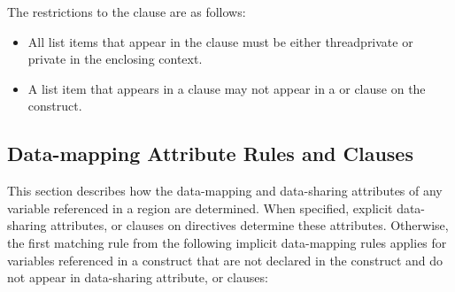 \restrictions
The restrictions to the  clause are as follows:

\begin{itemize}
\item All list items that appear in the  clause must be either threadprivate
or private in the enclosing context.

\item A list item that appears in a  clause may not appear in a  or
 clause on the  construct.


\end{itemize}







\vspace{-12 pt} %
\subsection{Data-mapping Attribute Rules and Clauses}
\label{subsec:Data-mapping Attribute Rules and Clauses}

This section describes how the data-mapping and data-sharing attributes of
any variable referenced in a  region are determined. When specified,
explicit data-sharing attributes,  or  clauses on
 directives determine these attributes.  Otherwise, the first matching rule
from the following implicit data-mapping rules applies for variables referenced
in a  construct that are not declared in the construct and do not appear in
data-sharing attribute,  or  clauses:

